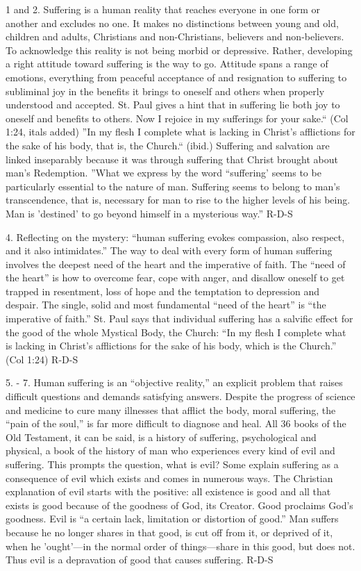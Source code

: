 \documentclass[oneside]{book}
\begin{document}
1 and 2. Suffering is a human reality that reaches everyone in one form or
another and excludes no one. It makes no distinctions between young and old,
children and adults, Christians and non-Christians, believers and
non-believers. To acknowledge this reality is not being morbid or
depressive. Rather, developing a right attitude toward suffering is the way to
go. Attitude spans a range of emotions, everything from peaceful acceptance of
and resignation to suffering to subliminal joy in the benefits it brings to
oneself and others when properly understood and accepted. St. Paul gives a hint
that in suffering lie both joy to oneself and benefits to others.
Now I rejoice in my sufferings for your sake.`` (Col 1:24, itals added) ''In my
flesh I complete what is lacking in Christ's afflictions for the sake of his
body, that is, the Church.`` (ibid.)
Suffering and salvation are linked inseparably because it was through suffering
that Christ brought about man's Redemption. ''What we express by the word
``suffering' seems to be particularly essential to the nature of man. Suffering
seems to belong to man's transcendence, that is, necessary for man to rise to
the higher levels of his being. Man is 'destined' to go beyond himself in a
mysterious way.''
R-D-S

4. Reflecting on the mystery:  ``human suffering evokes compassion, also
respect, and it also intimidates.'' The way to deal with every form of human
suffering involves the deepest need of the heart and the imperative of
faith. The ``need of the heart'' is how to overcome fear, cope with anger, and
disallow oneself to get trapped in resentment, loss of hope and the temptation
to depression and despair. The single, solid and most fundamental ``need of the
heart'' is ``the imperative of faith.'' St. Paul says that individual suffering
has a salvific effect for the good of the whole Mystical Body, the Church: ``In
my flesh I complete what is lacking in Christ's afflictions for the sake of his
body, which is the Church.'' (Col 1:24)
R-D-S

5. - 7. Human suffering is an ``objective reality,'' an explicit problem that
raises difficult questions and demands satisfying answers. Despite the progress
of science and medicine to cure many illnesses that afflict the body, moral
suffering, the ``pain of the soul,'' is far more difficult to diagnose and
heal. All 36 books of the Old Testament, it can be said, is a history of
suffering, psychological and physical, a book of the history of man who
experiences every kind of evil and suffering. This prompts the question, what is
evil? Some explain suffering as a consequence of evil which exists and comes in
numerous ways. The Christian explanation of evil starts with the positive: all
existence is good and all that exists is good because of the goodness of God,
its Creator. Good proclaims God's goodness. Evil is ``a certain lack, limitation
or distortion of good.'' Man suffers because he no longer shares in that good,
is cut off from it, or deprived of it, when he 'ought'---in the normal order of
things---share in this good, but does not. Thus evil is a depravation of good
that causes suffering.
R-D-S
\end{document}
